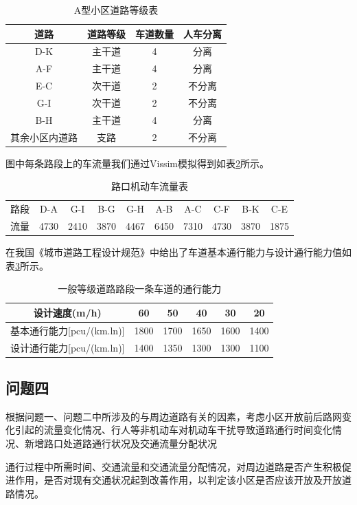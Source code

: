 \documentclass[fontset=windows,a4paper,12pt]{ctexart}
\begin{document}
		\begin{table}[!htbp]
			\centering
			\caption{A型小区道路等级表}
			\label{tab:road_level_a}
			\begin{tabular}{c|ccc}
				\toprule[1pt] 
				道路&				道路等级&	车道数量&	人车分离\\
				\hline
				D-K&	主干道&	4&			分离\\
				A-F&	主干道&	4&			分离\\
				E-C&	次干道&	2&			不分离\\
				G-I&	次干道&	2&			不分离\\
				B-H&	主干道&	4&			分离\\
				其余小区内道路	&	支路&		2&			不分离\\
				\bottomrule[1pt]
			\end{tabular} 
		\end{table}
		图中每条路段上的车流量我们通过Vissim模拟得到如表\ref{tab:car_flow_a}所示。
		\begin{table}[!htbp]
			\centering
			\caption{路口机动车流量表}
			\label{tab:car_flow_a}
			\begin{tabular}{c|ccccccccc}
				\toprule[1pt] 
				路段&	D-A&	G-I&	B-G&	G-H&	A-B&	A-C&	C-F&	B-K&	C-E\\
				流量&	4730&	2410&	3870&	4467&	6450&	7310&	4730&	3870&	1875\\
				\bottomrule[1pt]
			\end{tabular} 
		\end{table}
		在我国《城市道路工程设计规范》中给出了车道基本通行能力与设计通行能力值如表\ref{tab:road_flow}所示。
		\begin{table}[!htbp]
			\centering
			\caption{一般等级道路路段一条车道的通行能力}
			\label{tab:road_flow}
			\begin{tabular}{c|ccccc}
				\toprule[1pt] 
				设计速度(m/h)&	60&	50&	40&	30&	20\\
				\hline
				基本通行能力[pcu/(km.ln)]& 1800& 1700& 1650& 1600& 1400\\
				设计通行能力[pcu/(km.ln)]& 1400& 1350& 1300& 1300& 1100\\
				\bottomrule[1pt]
			\end{tabular} 
		\end{table}	

	\subsection{问题四}
		  根据问题一、问题二中所涉及的与周边道路有关的因素，考虑小区开放前后路网变化引起的流量变化情况、行人等非机动车对机动车干扰导致道路通行时间变化情况、新增路口处道路通行状况及交通流量分配状况

		通行过程中所需时间、交通流量和交通流量分配情况，对周边道路是否产生积极促进作用，是否对现有交通状况起到改善作用，以判定该小区是否应该开放及开放道路情况。
  \newpage
  
  
\end{document}
